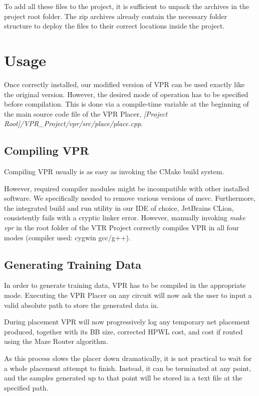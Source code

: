 To add all these files to the project, it is sufficient to unpack the archives in the project root folder. The zip archives already contain the necessary folder structure to deploy the files to their correct locations inside the project.

\section{Usage}

Once correctly installed, our modified version of \gls{VPR} can be used exactly like the original version. However, the desired mode of operation has to be specified before compilation. This is done via a compile-time variable at the beginning of the main source code file of the \gls{VPR} Placer, \textit{[Project Root]/VPR\_Project/vpr/src/place/place.cpp}.

\subsection{Compiling \gls{VPR}}

Compiling \gls{VPR} usually is as easy as invoking the CMake build system. 

However, required compiler modules might be incompatible with other installed software. We specifically needed to remove various versions of \gls{msvc}. Furthermore, the integrated build and run utility in our IDE of choice, JetBrains CLion, consistently fails with a cryptic linker error. However, manually invoking \textit{make vpr} in the root folder of the \gls{VTR} Project correctly compiles \gls{VPR} in all four modes (compiler used: cygwin gcc/g++).

\subsection{Generating Training Data}

In order to generate training data, \gls{VPR} has to be compiled in the appropriate mode. Executing the \gls{VPR} Placer on any circuit will now ask the user to input a valid absolute path to store the generated data in.

During placement \gls{VPR} will now progressively log any temporary net placement produced, together with its \gls{BB} size, corrected \gls{HPWL} cost, and cost if routed using the Maze Router algorithm.

As this process slows the placer down dramatically, it is not practical to wait for a whole placement attempt to finish. Instead, it can be terminated at any point, and the samples generated up to that point will be stored in a text file at the specified path.

